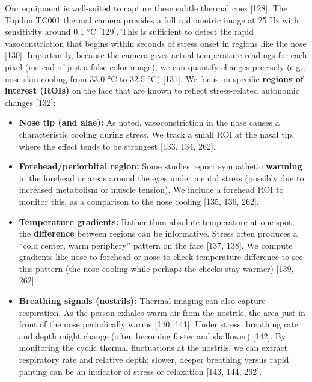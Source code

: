 \documentclass{article}
\begin{document}
    Our equipment is well-suited to capture these subtle thermal cues [128]. The Topdon TC001 thermal camera provides a full radiometric image at 25 Hz with sensitivity around 0.1 °C [129]. This is sufficient to detect the rapid vasoconstriction that begins within seconds of stress onset in regions like the nose [130]. Importantly, because the camera gives actual temperature readings for each pixel (instead of just a false-color image), we can quantify changes precisely (e.g., nose skin cooling from 33.0 °C to 32.5 °C) [131]. We focus on specific \textbf{regions of interest (ROIs)} on the face that are known to reflect stress-related autonomic changes [132]:
    \begin{itemize}
        \item \textbf{Nose tip (and alae):} As noted, vasoconstriction in the nose causes a characteristic cooling during stress. We track a small ROI at the nasal tip, where the effect tends to be strongest [133, 134, 262].
        \item \textbf{Forehead/periorbital region:} Some studies report sympathetic \textbf{warming} in the forehead or areas around the eyes under mental stress (possibly due to increased metabolism or muscle tension). We include a forehead ROI to monitor this, as a comparison to the nose cooling [135, 136, 262].
        \item \textbf{Temperature gradients:} Rather than absolute temperature at one spot, the \textbf{difference} between regions can be informative. Stress often produces a “cold center, warm periphery” pattern on the face [137, 138]. We compute gradients like nose-to-forehead or nose-to-cheek temperature difference to see this pattern (the nose cooling while perhaps the cheeks stay warmer) [139, 262].
        \item \textbf{Breathing signals (nostrils):} Thermal imaging can also capture respiration. As the person exhales warm air from the nostrils, the area just in front of the nose periodically warms [140, 141]. Under stress, breathing rate and depth might change (often becoming faster and shallower) [142]. By monitoring the cyclic thermal fluctuations at the nostrils, we can extract respiratory rate and relative depth; slower, deeper breathing versus rapid panting can be an indicator of stress or relaxation [143, 144, 262].
    \end{itemize}
\end{document}
